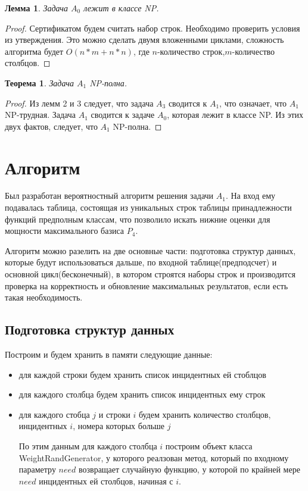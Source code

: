 \documentclass[a4paper,14pt]{extreport}
\newtheorem{thm}{Теорема}
\newtheorem{lm}{Лемма}
\begin{document}
\begin{lm}
Задача $A_0$ лежит в классе NP.
\end{lm}
\begin{proof}
Сертификатом будем считать набор строк. Необходимо проверить условия из утверждения. Это можно сделать двумя вложенными циклами, сложность алгоритма будет $O(n*m+n*n)$, где $n$-количество строк,$m$-количество столбцов.
\end{proof}

\begin{thm}
Задача $A_1$ NP-полна.
\end{thm}
\begin{proof}
Из лемм 2 и 3 следует, что задача $A_3$ сводится к $A_1$, что означает, что $A_1$ NP-трудная. Задача $A_1$ сводится к задаче $A_0$, которая лежит в классе NP. Из этих двух фактов, следует, что $A_1$ NP-полна.  
\end{proof}
\section{Алгоритм}
Был разработан вероятностный алгоритм решения задачи $A_1$. На вход ему подавалась таблица, состоящая из уникальных строк таблицы принадлежности функций предполным классам, что позволило искать нижние оценки для мощности максимального базиса $P_4$.

Алгоритм можно разелить на две основные части: подготовка структур данных, которые будут использоваться дальше, по входной таблице(предподсчет) и основной цикл(бесконечный), в котором строятся наборы строк и производится проверка на корректность и обновление максимальных результатов, если есть такая необходимость. 

\subsection{Подготовка структур данных}
Построим и будем хранить в памяти следующие данные:
\begin{itemize}
\item для каждой строки будем хранить список инцидентных ей стоблцов
\item для каждого столбца будем хранить список инцидентных ему строк
\item для каждого стобца $j$ и строки $i$ будем хранить количество столбцов, инцидентных $i$, номера которых больше $j$ 

По этим данным для каждого столбца $i$ построим объект класса WeightRandGenerator, у которого реалзован метод, который по входному параметру $need$ возвращает случайную функцию, у которой по крайней мере $need$ инцидентных ей столбцов, начиная с $i$.
\end{itemize}
\end{document}
